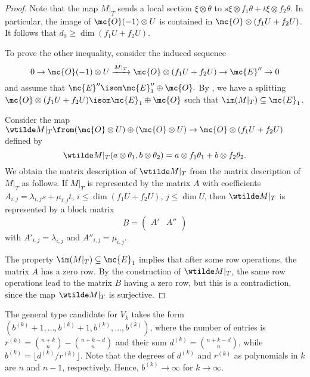 \begin{proof}
	Note that the map $M|_T$ sends a local section $\xi \otimes \theta$ to $s\xi \otimes f_1 \theta + t\xi \otimes f_2 \theta$. In particular, the image of $\mc{O}(-1)\otimes U$ is contained in $\mc{O} \otimes (f_1 U + f_2 U)$. It follows that $d_0 \geq \dim ({f_1 U + f_2 U})$.

  To prove the other inequality, consider the induced sequence
  \[
  	0 \to \mc{O}(-1)\otimes U \xrightarrow{M|_T} \mc{O}\otimes (f_1 U + f_2 U) \to \mc{E}'' \to 0
  \]
  and assume that $\mc{E}'' \isom \mc{E}_1''\oplus \mc{O}.$ By , we have a splitting $\mc{O}\otimes (f_1 U + f_2 U) \isom \mc{E}_1 \oplus \mc{O}$ such that $\im(M|_T) \subseteq \mc{E}_1$. 

  Consider the map
  $\wtilde M|_T \from (\mc{O} \otimes U) \oplus (\mc{O} \otimes U) \to \mc{O} \otimes (f_1 U + f_2 U)$
  defined by $$\wtilde M|_T(a\otimes \theta_1,b \otimes \theta_2)=a\otimes f_1 \theta_1 + b \otimes f_2 \theta_2.$$
  We obtain the matrix description of $\wtilde M|_T$ from the matrix description of $M|_T$ as follows. If $M|_T$ is represented by the matrix $A$ with coefficients $A_{i,j} = \lambda_{i,j} s + \mu_{i,j} t$, $i\leq \dim (f_1 U + f_2 U)$, $j\leq \dim U$, then $\wtilde M|_T$ is represented by a block matrix
  \[
  	B = \left(
  		\begin{array}{c|c}
  			A' & A'' \\
  		\end{array}
  	\right)
  \]
  with $A'_{i,j} = \lambda_{i,j}$ and $A''_{i,j} = \mu_{i,j}$.

  The property $\im(M|_T)\subseteq \mc{E}_1$ implies that after some row operations, the matrix $A$ has a zero row. By the construction of $\wtilde M|_T$, the same row operations lead to the matrix $B$ having a zero row, but this is a contradiction, since the map $\wtilde M|_T$ is surjective.
\end{proof}

\begin{remark}
	The general type candidate for $V_k$ takes the form
	$(b^{(k)}+1,\dotsc,b^{(k)}+1,b^{(k)},\dotsc,b^{(k)})$,
	where the number of entries is
	$r^{(k)} = \binom{n+k}{n} - \binom{n+k-d}{n}$
	and their sum $d^{(k)} = \binom{n+k-d}{n}$, while
	$b^{(k)} = \lfloor d^{(k)}/r^{(k)}\rfloor$.
	Note that the degrees of $d^{(k)}$ and $r^{(k)}$ as polynomials in $k$ are $n$ and $n-1$, respectively. Hence, $b^{(k)} \to \infty$ for $k \to \infty$.
\end{remark}

